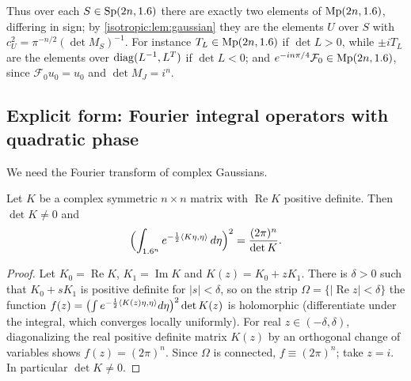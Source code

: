 Thus over each $S\in\mathrm{Sp}(2n,1.6)$ there are exactly two elements of
$\mathrm{Mp}(2n,1.6)$, differing in sign; by \cref{isotropic:lem:gaussian} they
are the elements $U$ over $S$ with $c_U^2=\pi^{-n/2}(\det M_S)^{-1}$. For
instance $T_L\in\mathrm{Mp}(2n,1.6)$ if $\det L>0$, while $\pm iT_L$ are the
elements over $\operatorname{diag}(L^{-1},L^T)$ if $\det L<0$; and $e^{-in\pi/4}\mathcal F_0\in\mathrm{Mp}(2n,1.6)$,
since $\mathcal F_0u_0=u_0$ and $\det M_J=i^n$.

\subsection{Explicit form: Fourier integral operators with quadratic phase}

We need the Fourier transform of complex Gaussians.

\begin{lemma}\label{isotropic:lem:complex-gaussian}
Let $K$ be a complex symmetric $n\times n$ matrix with $\operatorname{Re}K$
positive definite. Then $\det K\ne0$ and
\begin{equation*}
  \Bigl(\int_{1.6^n}e^{-\frac12\langle K\eta, \eta\rangle}\,d\eta\Bigr)^2=\frac{(2\pi)^n}{\det K}.
\end{equation*}
\end{lemma}
\begin{proof}
Let $K_0=\operatorname{Re}K$, $K_1=\operatorname{Im}K$ and
$K(z)=K_0+zK_1$. There is $\delta>0$ such that $K_0+sK_1$ is positive definite
for $|s|<\delta$, so on the strip $\Omega=\{|\operatorname{Re}z|<\delta\}$ the
function $f(z)=\bigl(\int e^{-\frac12\langle K(z)\eta, \eta\rangle}d\eta\bigr)^2\det K(z)$
is holomorphic (differentiate under the integral, which converges locally
uniformly). For real $z\in(-\delta,\delta)$, diagonalizing the real positive
definite matrix $K(z)$ by an orthogonal change of variables shows
$f(z)=(2\pi)^n$. Since $\Omega$ is connected, $f\equiv(2\pi)^n$; take $z=i$.
In particular $\det K\ne0$.
\end{proof}

